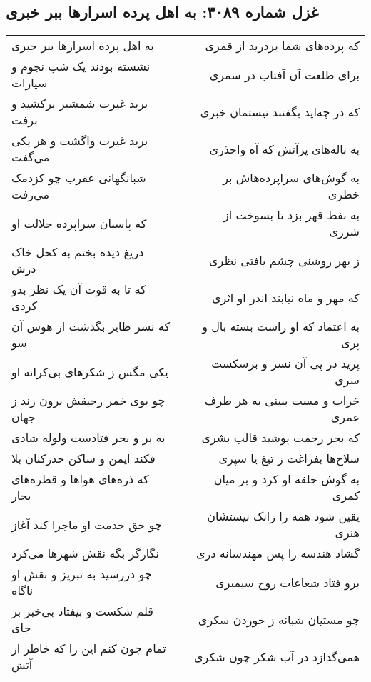 \begin{center}
\section*{غزل شماره ۳۰۸۹: به اهل پرده اسرارها ببر خبری}
\label{sec:3089}
\begin{longtable}{l p{0.5cm} r}
به اهل پرده اسرارها ببر خبری
&&
که پرده‌های شما بردرید از قمری
\\
نشسته بودند یک شب نجوم و سیارات
&&
برای طلعت آن آفتاب در سمری
\\
برید غیرت شمشیر برکشید و برفت
&&
که در چه‌اید بگفتند نیستمان خبری
\\
برید غیرت واگشت و هر یکی می‌گفت
&&
به ناله‌های پرآتش که آه واحذری
\\
شبانگهانی عقرب چو کزدمک می‌رفت
&&
به گوش‌های سراپرده‌هاش بر خطری
\\
که پاسبان سراپرده جلالت او
&&
به نفط قهر بزد تا بسوخت از شرری
\\
دریغ دیده بختم به کحل خاک درش
&&
ز بهر روشنی چشم یافتی نظری
\\
که تا به قوت آن یک نظر بدو کردی
&&
که مهر و ماه نیابند اندر او اثری
\\
که نسر طایر بگذشت از هوس آن سو
&&
به اعتماد که او راست بسته بال و پری
\\
یکی مگس ز شکرهای بی‌کرانه او
&&
پرید در پی آن نسر و برسکست سری
\\
چو بوی خمر رحیقش برون زند ز جهان
&&
خراب و مست ببینی به هر طرف عمری
\\
به بر و بحر فتادست ولوله شادی
&&
که بحر رحمت پوشید قالب بشری
\\
فکند ایمن و ساکن حذرکنان بلا
&&
سلاح‌ها بفراغت ز تیغ یا سپری
\\
که ذره‌های هواها و قطره‌های بحار
&&
به گوش حلقه او کرد و بر میان کمری
\\
چو حق خدمت او ماجرا کند آغاز
&&
یقین شود همه را زانک نیستشان هنری
\\
نگارگر بگه نقش شهرها می‌کرد
&&
گشاد هندسه را پس مهندسانه دری
\\
چو دررسید به تبریز و نقش او ناگاه
&&
برو فتاد شعاعات روح سیمبری
\\
قلم شکست و بیفتاد بی‌خبر بر جای
&&
چو مستیان شبانه ز خوردن سکری
\\
تمام چون کنم این را که خاطر از آتش
&&
همی‌گدازد در آب شکر چون شکری
\\
\end{longtable}
\end{center}

